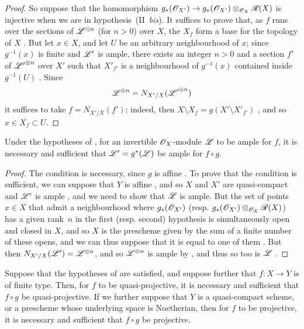 \begin{proof}
So suppose that the homomorphism $g_*(\sh{O}_{X'})\to g_*(\sh{O}_{X'})\otimes_{\sh{O}_X}\sh{R}(X)$ is injective when we are in hypothesis~(II~\emph{bis}).
It suffices to prove that, as $f$ runs over the sections of $\mathscr{L}^{\otimes n}$ (for $n>0$) over $X$, the $X_f$ form a base for the topology of $X$ .
But let $x\in X$, and let $U$ be an arbitrary neighbourhood of $x$;
since $g^{-1}(x)$ is finite  and $\mathscr{L}'$ is ample, there exists an integer $n>0$ and a section $f'$ of ${\mathscr{L}'}^{\otimes n}$ over $X'$ such that $X'_{f'}$ is a neighbourhood of $g^{-1}(x)$ contained inside $g^{-1}(U)$ .
Since
\[
  \mathscr{L}^{\otimes n} = N_{X'/X}({\mathscr{L}'}^{\otimes n})
\]
it suffices to take $f=N_{X'/X}(f')$;
indeed, then $X\setminus X_f=g(X'\setminus X'_{f'})$ , and so $x\in X_f\subset U$.
\end{proof}

\begin{corollary}[6.6.3]
\label{II.6.6.3}
Under the hypotheses of , for an invertible $\mathscr{O}_X$-module $\mathscr{L}$ to be ample for $f$, it is necessary and sufficient that $\mathscr{L}'=g^*(\mathscr{L})$ be ample for $f\circ g$.
\end{corollary}

\begin{proof}
The condition is necessary, since $g$ is affine .
To prove that the condition is sufficient, we can suppose that $Y$ is affine , and so $X$ and $X'$ are quasi-compact and $\mathscr{L}'$ is ample , and we need to show that $\mathscr{L}$ is ample.
But the set of points $x\in X$ that admit a neighbourhood where $g_*(\mathscr{O}_{X'})$ (resp. $g_*(\mathscr{O}_{X'})\otimes_{\mathscr{O}_X}\mathscr{R}(X)$) has a given rank~$n$ in the first (resp. second) hypothesis is simultaneously open and closed in $X$, and so $X$ is the prescheme given by the sum of a finite number of these opens, and we can thus suppose that it is equal to one of them .
But then $N_{X'/X}(\mathscr{L}')=\mathscr{L}^{\otimes n}$, and so $\mathscr{L}^{\otimes n}$ is ample by , and thus so too is $\mathscr{L}$ .
\end{proof}

\begin{corollary}[6.6.4]
\label{II.6.6.4}
Suppose that the hypotheses of  are satisfied, and suppose further that $f:X\to Y$ is of finite type.
Then, for $f$ to be quasi-projective, it is necessary and sufficient that $f\circ g$ be quasi-projective.
If we further suppose that $Y$ is a quasi-compact scheme, or a prescheme whose underlying space is Noetherian, then for $f$ to be projective, it is necessary and sufficient that $f\circ g$ be projective.
\end{corollary}

